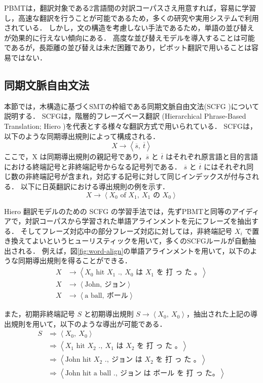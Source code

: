 \documentclass[japanese]{jnlp_1.4}
\begin{document}
PBMTは，翻訳対象である2言語間の対訳コーパスさえ用意すれば，容易に学習し，高速な翻訳を行うことが可能であるため，多くの研究や実用システムで利用されている．
しかし，文の構造を考慮しない手法であるため，単語の並び替えが効果的に行えない傾向にある．
高度な並び替えモデルを導入することは可能であるが\cite{goto13acl}，長距離の並び替えは未だ困難であり，ピボット翻訳で用いることは容易ではない．


\subsection{同期文脈自由文法}
\label{sec:scfg}

本節では，木構造に基づくSMTの枠組である同期文脈自由文法(SCFG \cite{chiang07})について説明する．
SCFGは，階層的フレーズベース翻訳 (Hierarchical Phrase-Based Translation; Hiero \cite{chiang07})を代表とする様々な翻訳方式で用いられている．
SCFGは，以下のような同期導出規則によって構成される．
\begin{equation}
X \longrightarrow \left<\overline{s},~ \overline{t}\right> \label{eqn:scfg}
\end{equation}
ここで，X は同期導出規則の親記号であり，$\overline{s}$ と $\overline{t}$ はそれぞれ原言語と目的言語における終端記号と非終端記号からなる記号列である．
$\overline{s}$ と $\overline{t}$ にはそれぞれ同じ数の非終端記号が含まれ，対応する記号に対して同じインデックスが付与される．
以下に日英翻訳における導出規則の例を示す．
\begin{equation}
X \longrightarrow \left<X_0 \text{~of~} X_1,~ X_1 \text{~の~} X_0\right>
\end{equation}

Hiero 翻訳モデルのための SCFG の学習手法では，先ずPBMTと同等のアイディアで，対訳コーパスから学習された単語アラインメントを元にフレーズを抽出する．
そしてフレーズ対応中の部分フレーズ対応に対しては，非終端記号 $X_i$ で置き換えてよいというヒューリスティックを用いて，多くのSCFGルールが自動抽出される．
例えば，図\ref{fig:word-align}の単語アラインメントを用いて，以下のような同期導出規則を得ることができる．
\begin{align}
X & \longrightarrow \left<X_0 \text{~hit~} X_1 \text{~.},~ X_0 \text{~は~} X_1 \text{~を 打 っ た 。}\right> \\
X & \longrightarrow \left<\text{John},~ \text{ジョン}\right> \\
X & \longrightarrow \left<\text{a ball},~ \text{ボール}\right>
\end{align}

また，初期非終端記号 $S$ と初期導出規則 $S \longrightarrow \left<X_0,~ X_0\right>$，抽出された上記の導出規則を用いて，以下のような導出が可能である．
\begin{align}
S & \Longrightarrow  \left<X_0,~ X_0\right> \\
& \Longrightarrow \left<X_1 \text{~hit~} X_2 \text{~.},~ X_1 \text{~は~} X_2 \text{~を 打 っ た 。}\right> \\
& \Longrightarrow \left<\text{John hit~} X_2 \text{~.},~ \text{ジョン は~} X_2 \text{~を 打 っ た 。}\right> \\
& \Longrightarrow \left<\text{John hit a ball .},~ \text{ジョン は ボール を 打 っ た。}\right>
\end{align}
\end{document}
